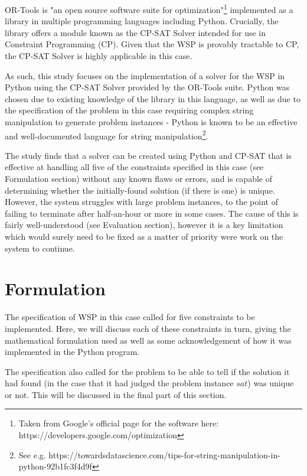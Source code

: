 \documentclass[11pt]{article}
\begin{document}
		OR-Tools is "an open source software suite for optimization"\footnote{Taken from Google's official page for the software here: https://developers.google.com/optimization}
		implemented as a library in multiple programming languages including Python.
		Crucially, the library offers a module known as the CP-SAT Solver intended for
		use in Constraint Programming (CP). Given that the WSP is provably tractable to
		CP\cite{benoist02}, the CP-SAT Solver is highly applicable in this case.

		As such, this study focuses on the implementation of a solver for the WSP
		in Python using the CP-SAT Solver provided by the OR-Tools suite. Python
		was chosen due to existing knowledge of the library in this language,
		as well as due to the specification of the problem in this case requiring
		complex string manipulation to generate problem instances - Python is
		known to be an effective and well-documented language for string
		manipulation\footnote{See e.g. https://towardsdatascience.com/tips-for-string-manipulation-in-python-92b1fc3f4d9f}.

		The study finds that a solver can be created using Python and CP-SAT that
		is effective at handling all five of the constraints specified in this case (see Formulation section)
		without any known flaws or errors, and is capable of determining whether
		the initially-found solution (if there is one) is unique. However, the
		system struggles with large problem instances, to the point of failing to
		terminate after half-an-hour or more in some cases. The cause of this is
		fairly well-understood (see Evaluation section), however it is a key limitation
		which would surely need to be fixed as a matter of priority were work on
		the system to continue.

	\section{Formulation}

		The specification of WSP in this case called for five constraints to be implemented.
		Here, we will discuss each of these constraints in turn, giving the mathematical
		formulation used as well as some acknowledgement of how it was implemented in the
		Python program.

		The specification also called for the problem to be able to tell if the solution
		it had found (in the case that it had judged the problem instance \(sat\)) was
		unique or not. This will be discussed in the final part of this section.
\end{document}
